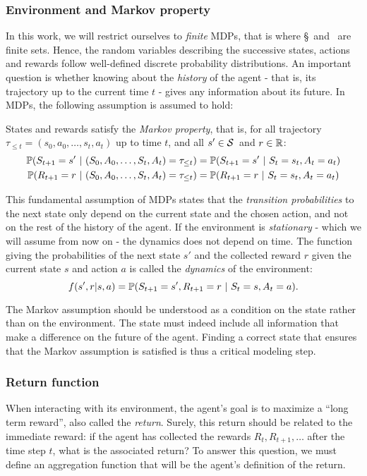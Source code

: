 			\subsubsection{Environment and Markov property} 
				In this work, we will restrict ourselves to\emph{ finite} MDPs, that is where \S~and \A~are finite sets. Hence, the random variables describing the successive states, actions and rewards follow well-defined discrete probability distributions. An important question is whether knowing about the\emph{ history} of the agent - that is, its trajectory up to the current time $t$ - gives any information about its future. In MDPs, the following assumption is assumed to hold:
				\begin{assumption}
					States and rewards satisfy the\emph{ Markov property}, that is, for all trajectory $\tau_{\leq t} = (s_0, a_0, \hdots, s_t, a_t)$ up to time $t$, and all $s'\in\S$~and $r\in\R$:
					\begin{align}
						\P(S_{t+1} = s'~|~(S_0, A_0, \hdots, S_t, A_t) = \tau_{\leq t}) & = \P(S_{t+1} = s'~|~S_t=s_t, A_t=a_t) \label{eq:markov assumption state}\\
						\P(R_{t+1} = r~|~(S_0, A_0, \hdots, S_t, A_t) = \tau_{\leq t}) & = \P(R_{t+1} = r~|~S_t=s_t, A_t=a_t) \label{eq:markov assumption reward}
					\end{align}
				\end{assumption}
				This fundamental assumption of MDPs states that the\emph{ transition probabilities} to the next state only depend on the current state and the chosen action, and not on the rest of the history of the agent. If the environment is\emph{ stationary} - which we will assume from now on - the dynamics does not depend on time. The function giving the probabilities of the next state $s'$ and the collected reward $r$ given the current state $s$ and action $a$ is called the\emph{ dynamics} of the environment:
				\begin{equation}
					f(s', r | s, a) = \P(S_{t+1} = s', R_{t+1} = r~|~S_t=s, A_t=a). \label{eq:dynamics}
				\end{equation}\par
				The Markov assumption should be understood as a condition on the state rather than on the environment. The state must indeed include all information that make a difference on the future of the agent. Finding a correct state that ensures that the Markov assumption is satisfied is thus a critical modeling step.
			\subsubsection{Return function}
				When interacting with its environment, the agent's goal is to maximize a \enquote{long term reward}, also called the\emph{ return}. Surely, this return should be related to the immediate reward: if the agent has collected the rewards $R_t, R_{t+1}, \hdots$ after the time step $t$, what is the associated return? To answer this question, we must define an aggregation function that will be the agent's definition of the return.
